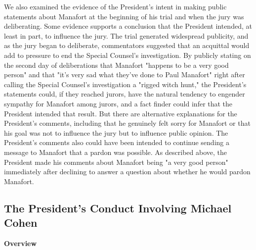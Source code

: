 We also examined the evidence of the President's intent in making public statements about Manafort at the beginning of his trial and when the jury was deliberating.
Some evidence supports a conclusion that the President intended, at least in part, to influence the jury.
The trial generated widespread publicity, and as the jury began to deliberate, commentators suggested that an acquittal would add to pressure to end the Special Counsel's investigation.
By publicly stating on the second day of deliberations that Manafort "happens to be a very good person" and that "it's very sad what they've done to Paul Manafort" right after calling the Special Counsel's investigation a "rigged witch hunt," the President's statements could, if they reached jurors, have the natural tendency to engender sympathy for Manafort among jurors, and a fact finder could infer that the President intended that result.
But there are alternative explanations for the President's comments, including that he genuinely felt sorry for Manafort or that his goal was not to influence the jury but to influence public opinion.
The President's comments also could have been intended to continue sending a message to Manafort that a pardon was possible.
As described above, the President made his comments about Manafort being "a very good person" immediately after declining to answer a question about whether he would pardon Manafort.


\subsection{The President's Conduct Involving Michael Cohen}

\begin{center}
\textbf{Overview}
\end{center}

